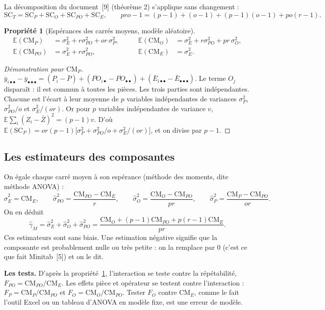 \documentclass[11pt,a4paper]{article}
\theoremstyle{sj}
\newtheorem{prop}[thm]{Propriété}
\theoremstyle{definition}
\theoremstyle{remark}
\newcommand{\E}{\mathbb{E}}
\newcommand{\SC}{\mathrm{SC}}
\newcommand{\CM}{\mathrm{CM}}
\newcommand{\ybar}{\bar y}
\newcommand{\dotp}{{\scriptscriptstyle\bullet}}
\newcommand{\gM}{\gamma_M}
\begin{document}
La décomposition du document~[9] (théorème 2) s'applique sans changement :
\[
\SC_T=\SC_P+\SC_O+\SC_{PO}+\SC_E,
\qquad pro-1=(p-1)+(o-1)+(p-1)(o-1)+po(r-1).
\]

\begin{prop}[Espérances des carrés moyens, modèle aléatoire]\label{prop:ems}
\[
\begin{aligned}
\E(\CM_P)&=\sigma_E^2+r\sigma_{PO}^2+or\,\sigma_P^2, &\qquad \E(\CM_O)&=\sigma_E^2+r\sigma_{PO}^2+pr\,\sigma_O^2,\\
\E(\CM_{PO})&=\sigma_E^2+r\sigma_{PO}^2, &\qquad \E(\CM_E)&=\sigma_E^2.
\end{aligned}
\]
\end{prop}

\begin{proof}[Démonstration pour $\CM_P$]
$\ybar_{i\dotp\dotp}-\ybar_{\dotp\dotp\dotp}=(P_i-\bar P)+(\overline{PO}_{i\dotp}-\overline{PO}_{\dotp\dotp})+(\bar E_{i\dotp\dotp}-\bar E_{\dotp\dotp\dotp})$. Le terme $O_j$ disparaît : il est commun à toutes les pièces. Les trois parties sont indépendantes. Chacune est l'écart à leur moyenne de $p$ variables indépendantes de variances $\sigma_P^2$, $\sigma_{PO}^2/o$ et $\sigma_E^2/(or)$. Or pour $p$ variables indépendantes de variance $v$, $\E\sum_i(Z_i-\bar Z)^2=(p-1)v$. D'où $\E(\SC_P)=or(p-1)\big[\sigma_P^2+\sigma_{PO}^2/o+\sigma_E^2/(or)\big]$, et on divise par $p-1$.
\end{proof}

\subsection{Les estimateurs des composantes}

On égale chaque carré moyen à son espérance (méthode des moments, dite méthode ANOVA) :
\[
\hat\sigma_E^2=\CM_E,\qquad
\hat\sigma_{PO}^2=\frac{\CM_{PO}-\CM_E}{r},\qquad
\hat\sigma_O^2=\frac{\CM_O-\CM_{PO}}{pr},\qquad
\hat\sigma_P^2=\frac{\CM_P-\CM_{PO}}{or}.
\]
On en déduit
\[
\hat\gM=\hat\sigma_E^2+\hat\sigma_O^2+\hat\sigma_{PO}^2=\frac{\CM_O+(p-1)\CM_{PO}+p(r-1)\CM_E}{pr}.
\]
Ces estimateurs sont sans biais. Une estimation négative signifie que la composante est probablement nulle ou très petite : on la remplace par 0 (c'est ce que fait Minitab~[5]) et on le dit.

\textbf{Les tests.} D'après la propriété~\ref{prop:ems}, l'interaction se teste contre la répétabilité, $F_{PO}=\CM_{PO}/\CM_E$. Les effets pièce et opérateur se testent contre l'interaction : $F_P=\CM_P/\CM_{PO}$ et $F_O=\CM_O/\CM_{PO}$. Tester $F_O$ contre $\CM_E$, comme le fait l'outil Excel ou un tableau d'ANOVA en modèle fixe, est une erreur de modèle.
\end{document}
